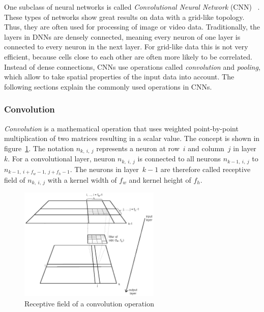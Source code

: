 One subclass of neural networks is called \emph{Convolutional Neural Network} (CNN) ~\cite[p.~359]{praxiseinstieg_ml17}. These types of networks show great results on data with a grid-like topology. Thus, they are often used for processing of image or video data. Traditionally, the layers in DNNs are densely connected, meaning every neuron of one layer is connected to every neuron in the next layer. For grid-like data this is not very efficient, because cells close to each other are often more likely to be correlated. Instead of dense connections, CNNs use operations called \emph{convolution} and \emph{pooling}, which allow to take spatial properties of the input data into account. The following sections explain the commonly used operations in CNNs.

\subsubsection{Convolution}
\label{sec:convolution}
\emph{Convolution} is a mathematical operation that uses weighted point-by-point multiplication of two matrices resulting in a scalar value. The concept is shown in figure~\ref{fig:convolution}. The notation $n_{k,~i,~j}$ represents a neuron at row~$i$ and column~$j$ in layer~$k$. For a convolutional layer, neuron $n_{k,~i,~j}$ is connected to all neurons $n_{k-1,~i,~j}$ to $n_{k-1,~i + f_w -1,~j + f_h -1}$. The neurons in layer~$k-1$ are therefore called receptive field of $n_{k,~i,~j}$ with a kernel width of $f_w$ and kernel height of $f_h$.~\cite[p.~361 f]{praxiseinstieg_ml17}

\begin{figure}[h]
    \centering
    \includegraphics[width=0.6\textwidth]{images/convolution_template}
    \caption{Receptive field of a convolution operation}
    \label{fig:convolution}
\end{figure}

